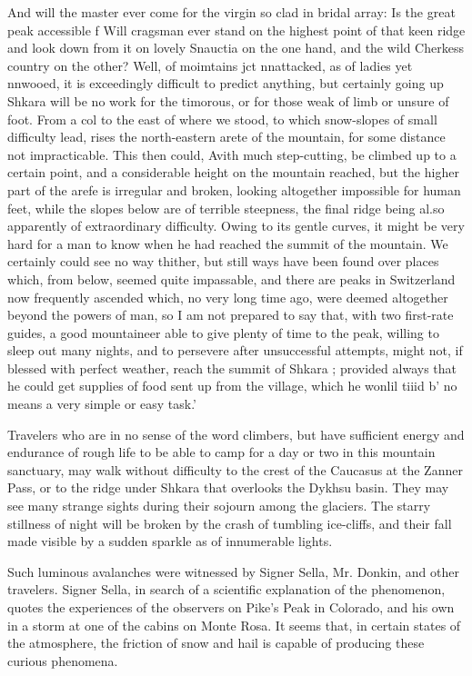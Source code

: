 \documentclass[25pt, a4paper]{article}
\begin{document}
And will the master ever come for the virgin so clad in bridal array: Is the great peak accessible f Will cragsman ever stand on the highest point of that keen ridge and look down from it on lovely Snauctia on the one hand, and the wild Cherkess country on the other? Well, of moimtains jct nnattacked, as of ladies yet nnwooed, it is exceedingly difficult to predict anything, but certainly going up Shkara will be no work for the timorous, or for those weak of limb or unsure of foot. From a col to the east of where we stood, to which snow-slopes of small difficulty lead, rises the north-eastern arete of the mountain, for some distance not impracticable. This then could, Avith much step-cutting, be climbed up to a certain point, and a considerable height on the mountain reached, but the higher part of the arefe is irregular and broken, looking altogether impossible for human feet, while the slopes below are of terrible steepness, the final ridge being al.so apparently of extraordinary difficulty. Owing to its gentle curves, it might be very hard for a man to know when he had reached the summit of the mountain. We certainly could see no way thither, but still ways have been found over places which, from below, seemed quite impassable, and there are peaks in Switzerland now frequently ascended which, no very long time ago, were deemed altogether beyond the powers of man, so I am not prepared to say that, with two first-rate guides, a good mountaineer able to give plenty of time to the peak, willing to sleep out many nights, and to persevere after unsuccessful attempts, might not, if blessed with perfect weather, reach the summit of Shkara ; provided always that he could get supplies of food sent up from the village, which he wonlil tiiid b' no means a very simple or easy task.'

Travelers who are in no sense of the word climbers, but have sufficient energy and endurance of rough life to be able to camp for a day or two in this mountain sanctuary, may walk without difficulty to the crest of the Caucasus at the Zanner Pass, or to the ridge under Shkara that overlooks the Dykhsu basin. They may see many strange sights during their sojourn among the glaciers. The starry stillness of night will be broken by the crash of tumbling ice-cliffs, and their fall made visible by a sudden sparkle as of innumerable lights.

Such luminous avalanches were witnessed by Signer Sella, Mr. Donkin, and other travelers. Signer Sella, in search of a scientific explanation of the phenomenon, quotes the experiences of the observers on Pike's Peak in Colorado, and his own in a storm at one of the cabins on Monte Rosa. It seems that, in certain states of the atmosphere, the friction of snow and hail is capable of producing these curious phenomena.
\end{document}
